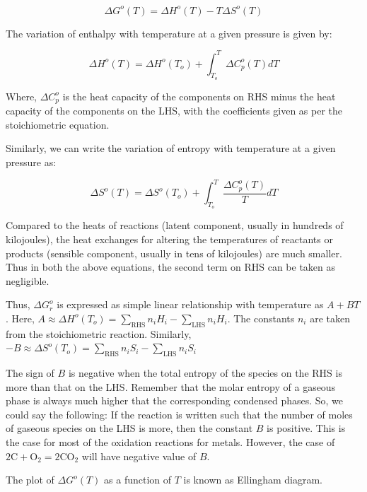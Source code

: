 \begin{equation}
\Delta G^o (T) = \Delta H^o (T) - T \Delta S^o(T)
\end{equation}

The variation of enthalpy with temperature at a given pressure is given by:

\begin{equation}
\Delta H^o (T) = \Delta H^o (T_o) + \int_{T_o}^{T}{ \Delta C_p^o(T) dT}
\end{equation}

Where, $\Delta C_p^o$ is the heat capacity of the components on RHS minus the heat capacity of the components on the LHS, with the coefficients given as per the stoichiometric equation.

Similarly, we can write the variation of entropy with temperature at a given pressure as:

\begin{equation}
\Delta S^o (T) = \Delta S^o (T_o) + \int_{T_o}^{T}{\frac{\Delta C_p^o(T)}{T} dT}
\end{equation}

Compared to the heats of reactions (latent component, usually in hundreds of kilojoules), the heat exchanges for altering the temperatures of reactants or products (sensible component, usually in tens of kilojoules) are much smaller. Thus in both the above equations, the second term on RHS can be taken as negligible.

Thus, $\Delta G^o_r$ is expressed as simple linear relationship with temperature as $A + BT$. Here, $A \approx \Delta H^o (T_o) = \sum_\text{RHS}{n_i H_i}-\sum_\text{LHS}{n_i H_i}$. The constants $n_i$ are taken from the stoichiometric reaction. Similarly, $-B \approx \Delta S^o(T_o) = \sum_\text{RHS}{n_i S_i}-\sum_\text{LHS}{n_i S_i}$

The sign of $B$ is negative when the total entropy of the species on the RHS is more than that on the LHS. Remember that the molar entropy of a gaseous phase is always much higher that the corresponding condensed phases. So, we could say the following: If the reaction is written such that the number of moles of gaseous species on the LHS is more, then the constant $B$ is positive. This is the case for most of the oxidation reactions for metals. However, the case of $ 2 \text{C} + \text{O}_2 = 2 \text{CO}_2 $ will have negative value of $B$. 

The plot of $\Delta G^o (T)$ as a function of $T$ is known as Ellingham diagram.

